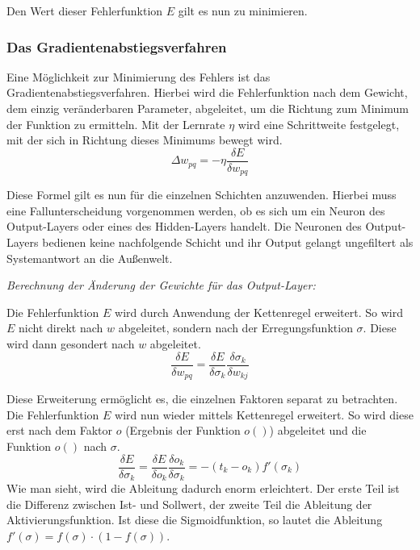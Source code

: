 Den Wert dieser Fehlerfunktion $E$ gilt es nun zu minimieren.

\subsubsection{Das Gradientenabstiegsverfahren}
Eine Möglichkeit zur Minimierung des Fehlers ist das Gradientenabstiegsverfahren. Hierbei wird die Fehlerfunktion nach dem Gewicht, dem einzig veränderbaren Parameter, abgeleitet, um die Richtung zum Minimum der Funktion zu ermitteln. Mit der Lernrate $\eta$ wird eine Schrittweite festgelegt, mit der sich in Richtung dieses Minimums bewegt wird.
\begin{equation}
\Delta w_{pq}=-\eta \frac{\delta E}{\delta w_{pq}}
\end{equation}

Diese Formel gilt es nun für die einzelnen Schichten anzuwenden. Hierbei muss eine Fall\-unter\-scheidung vorgenommen werden, ob es sich um ein Neuron des Output-Layers oder eines des Hidden-Layers handelt. Die Neuronen des Output-Layers bedienen keine nachfolgende Schicht und ihr Output gelangt ungefiltert als Systemantwort an die Außenwelt.

\emph{Berechnung der Änderung der Gewichte für das Output-Layer:}

Die Fehlerfunktion $E$ wird durch Anwendung der Kettenregel erweitert. So wird $E$ nicht direkt nach $w$ abgeleitet, sondern nach der Erregungsfunktion $\sigma$. Diese wird dann gesondert nach $w$ abgeleitet.
\begin{equation}
\frac{\delta E}{\delta w_{pq}} = \frac{\delta E}{\delta \sigma_{k}} \frac{\delta \sigma_{k}}{\delta w_{kj}}
\label{eqn:output-erw}
\end{equation}

Diese Erweiterung ermöglicht es, die einzelnen Faktoren separat zu betrachten. Die Fehlerfunktion $E$ wird nun wieder mittels Kettenregel erweitert. So wird diese erst nach dem Faktor $o$ (Ergebnis der Funktion $o()$) abgeleitet und die Funktion $o()$ nach $\sigma$.
\begin{equation}
\frac{\delta E}{\delta \sigma_{k}} = \frac{\delta E}{\delta o_{k}} \frac{\delta o_k}{\delta \sigma_k} = -(t_k - o_k) f'(\sigma_k)
\end{equation}
Wie man sieht, wird die Ableitung dadurch enorm erleichtert. Der erste Teil ist die Differenz zwischen Ist- und Sollwert, der zweite Teil die Ableitung der Aktivierungsfunktion. Ist diese die Sigmoidfunktion, so lautet die Ableitung $f'(\sigma)=f(\sigma)\cdot (1-f(\sigma))$.


